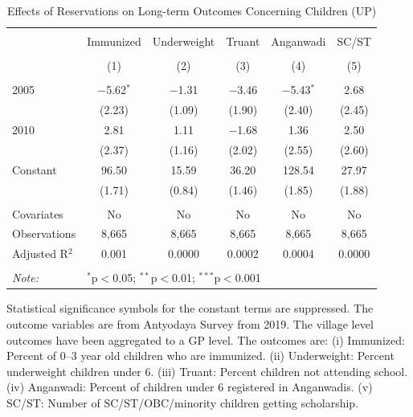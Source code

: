 \begin{table}[!htbp]
\centering
\begin{threeparttable}

  \caption{Effects of Reservations on Long-term Outcomes Concerning Children (UP)} 
  \label{up_shrug_children_05_10} 
\scriptsize 
\begin{tabular}{@{\extracolsep{0pt}}lccccc} 
\\[-1.8ex]\hline 
\hline \\[-1.8ex] 
 & Immunized & Underweight & Truant & Anganwadi & SC/ST \\ 
\\[-1.8ex] & (1) & (2) & (3) & (4) & (5)\\ 
\hline \\[-1.8ex] 
 2005 & $-$5.62$^{*}$ & $-$1.31 & $-$3.46 & $-$5.43$^{*}$ & 2.68 \\ 
  & (2.23) & (1.09) & (1.90) & (2.40) & (2.45) \\ 
  2010 & 2.81 & 1.11 & $-$1.68 & 1.36 & 2.50 \\ 
  & (2.37) & (1.16) & (2.02) & (2.55) & (2.60) \\ 
  Constant & 96.50 & 15.59 & 36.20 & 128.54 & 27.97 \\ 
  & (1.71) & (0.84) & (1.46) & (1.85) & (1.88) \\ 
 \hline \\[-1.8ex] 
Covariates & No & No & No & No & No \\ 
Observations & 8,665 & 8,665 & 8,665 & 8,665 & 8,665 \\ 
Adjusted R$^{2}$ & 0.001 & 0.0000 & 0.0002 & 0.0004 & 0.0000 \\ 
\hline 
\hline \\[-1.8ex] 
\textit{Note:}  & \multicolumn{5}{l}{$^{*}$p$<$0.05; $^{**}$p$<$0.01; $^{***}$p$<$0.001} \\ 
\end{tabular} 
\begin{tablenotes}[flushleft]
\scriptsize
\item[] Statistical significance symbols for the constant terms are suppressed. The outcome variables are from Antyodaya Survey from 2019.
                   The village level outcomes have been aggregated to a GP level. The outcomes are:
                   (i) Immunized: Percent of 0--3 year old children who are immunized.
                   (ii) Underweight: Percent underweight children under 6.
                   (iii) Truant: Percent children not attending school.
                   (iv) Anganwadi: Percent of children under 6 registered in Anganwadis.
                   (v) SC/ST: Number of SC/ST/OBC/minority children getting scholarship.
\end{tablenotes}
\end{threeparttable}
\end{table}

